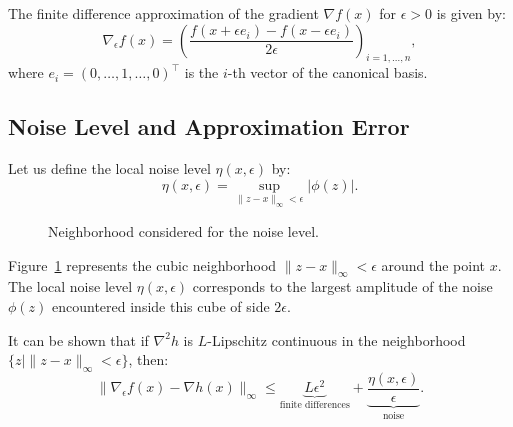 The finite difference approximation of the gradient $\nabla f(x)$ for $\epsilon > 0$ is given by:
\[
    \nabla_\epsilon f(x) = \left( \frac{f(x+\epsilon e_i) - f(x-\epsilon e_i)}{2\epsilon} \right)_{i=1,\dots,n},
\]
where $e_i = (0, \dots, 1, \dots, 0)^\top$ is the $i$-th vector of the canonical basis.

\subsection{Noise Level and Approximation Error}

Let us define the local noise level $\eta(x, \epsilon)$ by:
\begin{equation}
    \eta(x, \epsilon) = \sup_{\|z-x\|_\infty < \epsilon} |\phi(z)|.
\end{equation}

\begin{figure}[H]
\centering
{}
\caption{Neighborhood considered for the noise level.}
\label{fig:noise-cube}
\end{figure}

\begin{figureexplanation}
Figure~\ref{fig:noise-cube} represents the cubic neighborhood $\|z - x\|_\infty < \epsilon$ around the point $x$. The local noise level $\eta(x, \epsilon)$ corresponds to the largest amplitude of the noise $\phi(z)$ encountered inside this cube of side $2\epsilon$.
\end{figureexplanation}

It can be shown that if $\nabla^2 h$ is $L$-Lipschitz continuous in the neighborhood $\{z \mid \|z-x\|_\infty < \epsilon\}$, then:
\begin{equation}
    \|\nabla_\epsilon f(x) - \nabla h(x)\|_\infty \le \underbrace{L \epsilon^2}_{\text{finite differences}} + \underbrace{\frac{\eta(x, \epsilon)}{\epsilon}}_{\text{noise}}.
\end{equation}

